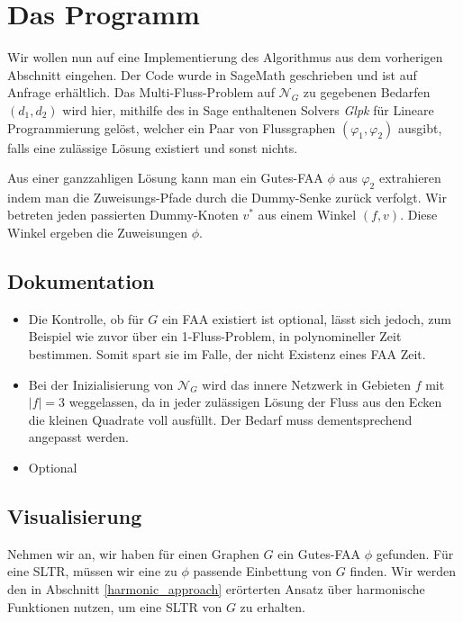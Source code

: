 \chapter{Das Programm}\label{the_program}

Wir wollen nun auf eine Implementierung des Algorithmus aus dem vorherigen Abschnitt eingehen. Der Code wurde in SageMath \cite{sage} geschrieben und ist auf Anfrage erhältlich. Das Multi-Fluss-Problem auf $\mathcal{N}_G$ zu gegebenen Bedarfen $(d_1,d_2)$ wird hier, mithilfe des in Sage enthaltenen Solvers \textit{Glpk} \cite{glpk} für Lineare Programmierung gelöst, welcher ein Paar von Flussgraphen $(\varphi_1,\varphi_2)$ ausgibt, falls eine zulässige Lösung existiert und sonst nichts.



Aus einer ganzzahligen Lösung kann man ein Gutes-FAA $\phi$ aus $\varphi_2$ extrahieren indem man die Zuweisungs-Pfade durch die Dummy-Senke zurück verfolgt. Wir betreten jeden passierten Dummy-Knoten $v^*$ aus einem Winkel $(f,v)$. Diese Winkel ergeben die Zuweisungen $\phi$.

\section{Dokumentation}


\begin{itemize}
\item Die Kontrolle, ob für $G$ ein FAA existiert ist optional, lässt sich jedoch, zum Beispiel wie zuvor über ein 1-Fluss-Problem, in polynomineller Zeit bestimmen. Somit spart sie im Falle, der nicht Existenz eines FAA Zeit. 
\item Bei der Inizialisierung von $\mathcal{N}_G$ wird das innere Netzwerk in Gebieten $f$ mit $|f|=3$ weggelassen, da in jeder zulässigen Lösung der Fluss aus den Ecken die kleinen Quadrate voll ausfüllt. Der Bedarf muss dementsprechend angepasst werden.
\item  Optional 
\end{itemize}

\section{Visualisierung}

Nehmen wir an, wir haben für einen Graphen $G$ ein Gutes-FAA $\phi$ gefunden. Für eine SLTR, müssen wir eine zu $\phi$ passende Einbettung von $G$ finden. Wir werden den in Abschnitt \ref{harmonic_approach} erörterten Ansatz über harmonische Funktionen nutzen, um eine SLTR von $G$ zu erhalten.

